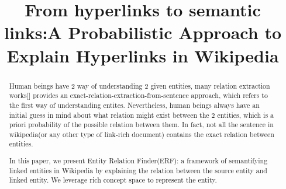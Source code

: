 \documentclass[letterpaper]{article}
\newcommand{\Blue}[1]{\textcolor[rgb]{0.00,1.00,0.00}{#1}}
\newcommand{\xch}[1]{\Blue{#1}}
\begin{document}
\title{From hyperlinks to semantic links:A Probabilistic Approach to Explain Hyperlinks in Wikipedia}




\maketitle
\begin{abstract}
\xch{Human beings have 2 way of understanding 2 given entities, many relation extraction works[] provides an exact-relation-extraction-from-sentence approach, which refers to the first way of understanding entites.
Nevertheless, human beings always have an initial guess in mind about what relation might exist between the 2 entities, which is a priori probability of the possible relation between them.
In fact, not all the sentence in wikipedia(or any other type of link-rich document) contains the exact relation between entities.
}

In this paper, we present Entity Relation Finder(ERF): a framework of semantifying linked entities in Wikipedia by explaining the relation between the source entity and linked entity. We leverage rich concept space to represent the entity.

\end{abstract}











%

\end{document}
